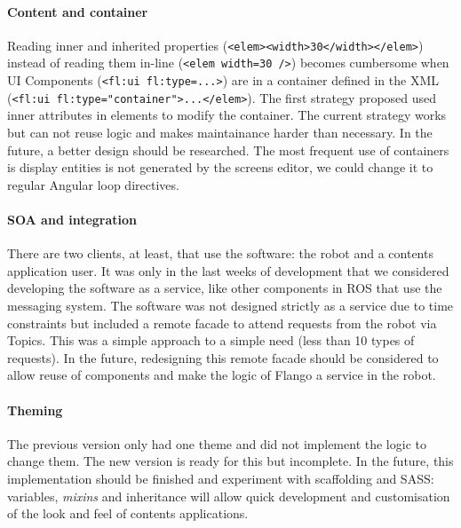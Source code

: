 \paragraph{Content and container} Reading inner and inherited properties (\lstinline$<elem><width>30</width></elem>$) instead of reading them in-line (\lstinline$<elem width=30 />$) becomes cumbersome when UI Components (\lstinline$<fl:ui fl:type=...>$) are in a container defined in the \ac{XML} (\lstinline$<fl:ui fl:type="container">...</elem>$).
The first strategy proposed used inner attributes in elements to modify the container.
The current strategy works but can not reuse logic and makes maintainance harder than necessary.
In the future, a better design should be researched.
The most frequent use of containers is display entities is not generated by the screens editor, we could change it to regular Angular loop directives.

\paragraph{SOA and integration} There are two clients, at least, that use the software: the robot and a contents application user.
It was only in the last weeks of development that we considered developing the software as a service, like other components in \ac{ROS} that use the messaging system.
The software was not designed strictly as a service due to time constraints but included a remote facade to attend requests from the robot via Topics.
This was a simple approach to a simple need (less than 10 types of requests).
In the future, redesigning this remote facade should be considered to allow reuse of components and make the logic of Flango \cm a service in the robot.

\paragraph{Theming} The previous version only had one theme and did not implement the logic to change them.
The new version is ready for this but incomplete.
In the future, this implementation should be finished and experiment with scaffolding and SASS: variables, \textit{mixins} and inheritance will allow quick development and customisation of the look and feel of contents applications.
